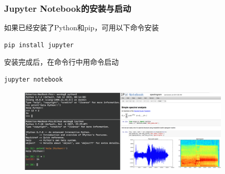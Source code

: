 \begin{frame}[fragile]
	\frametitle{\textrm{Jupyter Notebook}的安装与启动}
	如果已经安装了\textrm{Python}和\textrm{pip}，可用以下命令安装
    \begin{lstlisting}[style=pythonstyle]
pip install jupyter
    \end{lstlisting}
    安装完成后，在命令行中用命令启动
    \begin{lstlisting}[style=pythonstyle]
jupyter notebook
    \end{lstlisting}
    {\fontsize{7.2pt}{4.2pt}}
\begin{figure}[h!]
\vspace*{-0.05in}
\centering
\includegraphics[height=1.6in, width=4.0in, viewport=0 0 520 220,clip]{Figures/Jupyter_ipython.png}
\label{Jupyter_notebook_Framework}
\end{figure}
\end{frame}


